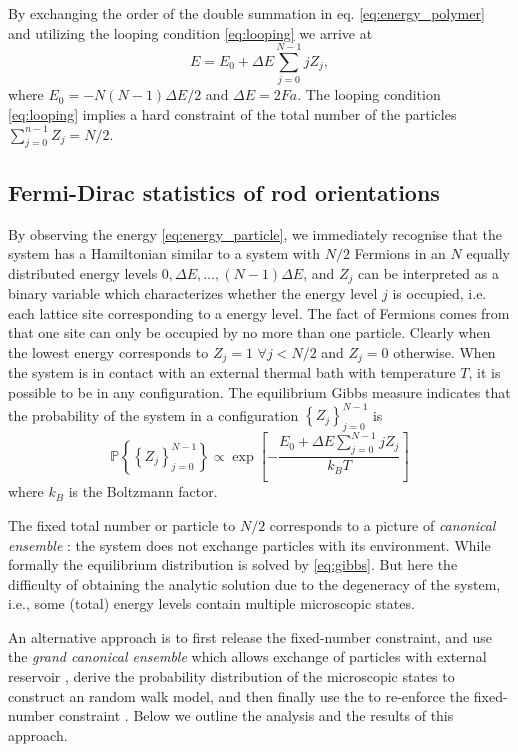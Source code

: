 \documentclass[aps,showpacs,twocolumn,floatfix,prx,superscriptaddress]{revtex4-1}
\begin{document}
By exchanging the order of the double summation in eq.
\eqref{eq:energy_polymer} and utilizing the looping condition \eqref{eq:looping} we 
arrive at 
\begin{equation}
    \label{eq:energy_particle}
    E = E_0 + \Delta E \sum_{j=0}^{N-1} j Z_j, 
\end{equation}
where $E_0= - N(N-1) \Delta E /2$ and $\Delta E = 2Fa$. The looping condition
\eqref{eq:looping} implies a hard constraint of the total number of the particles
$\sum_{j=0}^{n-1} Z_j = N/2$.

\subsection{Fermi-Dirac statistics of rod orientations}
By observing the energy \eqref{eq:energy_particle}, we immediately recognise
that the system has a Hamiltonian similar to a system with $N/2$ Fermions in an
$N$ equally distributed energy levels $0, \Delta E, \ldots, (N-1) \Delta E$, and
$Z_j$ can be interpreted as a binary variable which characterizes whether the
energy level $j$ is occupied, i.e. each lattice site corresponding to a energy
level. The fact of Fermions comes from that one site can only be occupied by no
more than one particle. 
Clearly when the lowest energy corresponds to $Z_j = 1$ $\forall j < N/2$ and
$Z_j=0$ otherwise. When the system is in contact with an external thermal bath
with temperature $T$, it is possible to be in any configuration. The equilibrium
Gibbs measure indicates that the probability of the system in a configuration
$\left\{Z_j\right\}_{j=0}^{N-1}$ is
\begin{equation}
    \label{eq:gibbs}
    \mathbb{P}\left\{\left\{Z_j\right\}_{j=0}^{N-1}\right\} \propto \exp
    \left[-\frac{E_0 + \Delta E \sum_{j=0}^{N-1} j Z_j}{k_B T}\right]
\end{equation}
where $k_B$ is the Boltzmann factor. 

The fixed total number or particle to $N/2$ corresponds to a picture of
\emph{canonical ensemble} \cite{Chandler1987,Huang2001}: the system does not exchange particles with
its environment. While formally the equilibrium distribution is solved by
\eqref{eq:gibbs}. But here the difficulty of obtaining the analytic solution due
to the degeneracy of the system, i.e., some (total) energy levels contain
multiple microscopic states. 

An alternative approach is to first release the fixed-number constraint, and use
the \emph{grand canonical ensemble} which allows exchange of particles with
external reservoir \cite{Chandler1987,Huang2001}, derive the probability
distribution of the microscopic states to construct an random walk model, and
then finally use the to re-enforce the fixed-number constraint
\cite{Lin2015}. Below we outline the analysis and the results of this
approach. 
\end{document}
